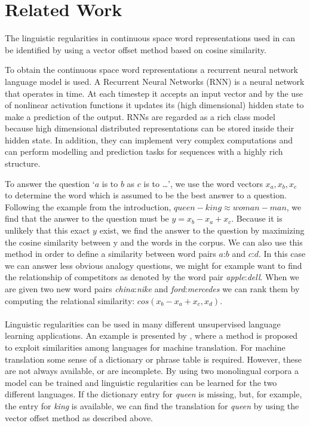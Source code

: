 \documentclass[11pt]{article}
\begin{document}
\section{Related Work}
The linguistic regularities in continuous space word representations used in \cite{Mikolov:13} can be identified by using a vector offset method based on cosine similarity. 

To obtain the continuous space word representations a recurrent neural network language model is used. A Recurrent Neural Networks (RNN) is a neural network that operates in time. At each timestep it accepts an input vector and by the use of nonlinear activation functions it updates its (high dimensional) hidden state to make a prediction of the output. RNNs are regarded as a rich class model because high dimensional distributed representations can be stored inside their hidden state. In addition, they can implement very complex computations and can perform modelling and prediction tasks for sequences with a highly rich structure.

To answer the question `$a$ is to $b$ as $c$ is to \dots', we use the word vectors $x_a, x_b, x_c$ to determine the word which is assumed to be the best answer to a question. Following the example from the introduction, $\textit{queen} - \textit{king} \approx \textit{woman}  -\textit{man}$, we find that the answer to the question must be $y = x_b - x_a + x_c$. Because it is unlikely that this exact $y$ exist, we find the answer to the question by maximizing the cosine similarity between y and the words in the corpus. We can also use this method in order to define a similarity between word pairs $a$:$b$ and $c$:$d$. In this case we can answer less obvious analogy questions, we might for example want to find the relationship of competitors as denoted by the word pair \textit{apple}:\textit{dell}. When we are given two new word pairs \textit{china}:\textit{nike} and \textit{ford}:\textit{mercedes} we can rank them by computing the relational similarity: $cos(x_b - x_a + x_c, x_d)$.\\\\
Linguistic regularities can be used in many different unsupervised language learning applications. An example is presented by \cite{MikolovMT:13}, where a method is proposed to exploit similarities among languages for machine translation. For machine translation some sense of a dictionary or phrase table is required. However, these are not always available, or are incomplete. By using two monolingual corpora a model can be trained and linguistic regularities can be learned for the two different languages. If the dictionary entry for \textit{queen} is missing, but, for example, the entry for \textit{king} is available, we can find the translation for \textit{queen} by using the vector offset method as described above.
\end{document}
